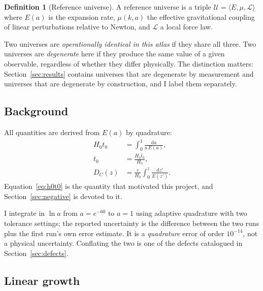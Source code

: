 \documentclass[11pt,a4paper]{article}
\theoremstyle{definition}
\newtheorem{definition}[theorem]{Definition}
\newcommand{\Hzt}{H_0 t_0}
\newcommand{\muc}{\mu(k,a)}
\begin{document}
\begin{definition}[Reference universe]
A reference universe is a triple $\mathcal{U} = \langle E, \mu, \mathcal{L}
\rangle$ where $E(a)$ is the expansion rate, $\muc$ the effective
gravitational coupling of linear perturbations relative to Newton,
and $\mathcal{L}$ a local force law.
\end{definition}

Two universes are \emph{operationally identical in this atlas} if they share
all three. Two universes are \emph{degenerate} here if they produce the same
value of a given observable, regardless of whether they differ physically.
The distinction matters: Section~\ref{sec:results} contains universes that are
degenerate by measurement and universes that are degenerate by construction,
and I label them separately.

\subsection{Background}

All quantities are derived from $E(a)$ by quadrature:
\begin{align}
\Hzt &= \int_0^1 \frac{\mathrm{d}a}{a\,E(a)},
\label{eq:h0t0}\\
t_0 &= \frac{\Hzt}{H_0},
\label{eq:age}\\
D_C(z) &= \frac{c}{H_0}\int_0^{z} \frac{\mathrm{d}z'}{E(z')}.
\label{eq:dc}
\end{align}
Equation~\eqref{eq:h0t0} is the quantity that motivated this project, and
Section~\ref{sec:negative} is devoted to it.

I integrate in $\ln a$ from $a = e^{-60}$ to $a = 1$ using adaptive
quadrature with two tolerance settings; the reported uncertainty is the
difference between the two runs plus the first run's own error estimate. It
is a \emph{quadrature} error of order $10^{-14}$, not a physical uncertainty.
Conflating the two is one of the defects catalogued in
Section~\ref{sec:defects}.

\subsection{Linear growth}
\end{document}
